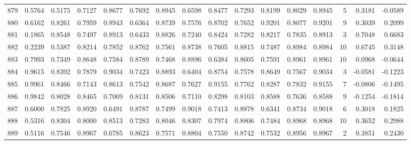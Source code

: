 \begin{tabular}{lrrrrrrrrrrrrrrr}
879 &      0.5764 &  0.5175 &  0.7127 &  0.8677 &  0.7692 &  0.8945 &  0.6598 &  0.8477 &  0.7293 &  0.8199 &   0.8029 &     0.8945 &      5 &                    0.3181 &                    -0.0589 \\
880 &      0.6162 &  0.8261 &  0.7959 &  0.8943 &  0.6364 &  0.8739 &  0.7576 &  0.8702 &  0.7652 &  0.9201 &   0.8077 &     0.9201 &      9 &                    0.3039 &                     0.2099 \\
881 &      0.1865 &  0.8548 &  0.7497 &  0.8913 &  0.6433 &  0.8826 &  0.7240 &  0.8424 &  0.7282 &  0.8217 &   0.7835 &     0.8913 &      3 &                    0.7048 &                     0.6683 \\
882 &      0.2239 &  0.5387 &  0.8214 &  0.7852 &  0.8762 &  0.7561 &  0.8738 &  0.7605 &  0.8815 &  0.7487 &   0.8984 &     0.8984 &     10 &                    0.6745 &                     0.3148 \\
883 &      0.7993 &  0.7349 &  0.8648 &  0.7584 &  0.8789 &  0.7468 &  0.8896 &  0.6384 &  0.8605 &  0.7591 &   0.8961 &     0.8961 &     10 &                    0.0968 &                    -0.0644 \\
884 &      0.9615 &  0.8392 &  0.7879 &  0.9034 &  0.7423 &  0.8893 &  0.6404 &  0.8754 &  0.7578 &  0.8649 &   0.7567 &     0.9034 &      3 &                   -0.0581 &                    -0.1223 \\
885 &      0.9961 &  0.8466 &  0.7143 &  0.8613 &  0.7542 &  0.8687 &  0.7627 &  0.9155 &  0.7762 &  0.8287 &   0.7832 &     0.9155 &      7 &                   -0.0806 &                    -0.1495 \\
886 &      0.9842 &  0.8028 &  0.8465 &  0.7069 &  0.8131 &  0.8506 &  0.7110 &  0.8298 &  0.8103 &  0.8588 &   0.7636 &     0.8588 &      9 &                   -0.1254 &                    -0.1814 \\
887 &      0.6000 &  0.7825 &  0.8920 &  0.6491 &  0.8787 &  0.7499 &  0.9018 &  0.7413 &  0.8878 &  0.6341 &   0.8734 &     0.9018 &      6 &                    0.3018 &                     0.1825 \\
888 &      0.5316 &  0.8304 &  0.8000 &  0.8513 &  0.7283 &  0.8046 &  0.8307 &  0.7974 &  0.8806 &  0.7484 &   0.8968 &     0.8968 &     10 &                    0.3652 &                     0.2988 \\
889 &      0.5116 &  0.7546 &  0.8967 &  0.6785 &  0.8623 &  0.7571 &  0.8804 &  0.7550 &  0.8742 &  0.7532 &   0.8956 &     0.8967 &      2 &                    0.3851 &                     0.2430 \\

\end{tabular}

